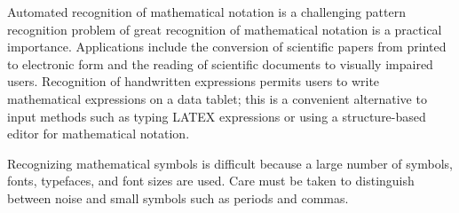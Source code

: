 \par
\indent Automated recognition of mathematical notation is a challenging pattern recognition problem of great recognition of mathematical notation is a practical importance. Applications include the conversion of scientific papers from printed to electronic form and the reading of scientific documents to visually impaired users. Recognition of handwritten expressions permits users to write mathematical expressions on a data tablet; this is a convenient alternative to input methods such as typing LATEX expressions or using a structure-based editor for mathematical notation.\\
\par
Recognizing mathematical symbols is difficult because a large number of symbols, fonts, typefaces, and font sizes are used. Care must be taken to distinguish between noise and small symbols such as periods and commas.